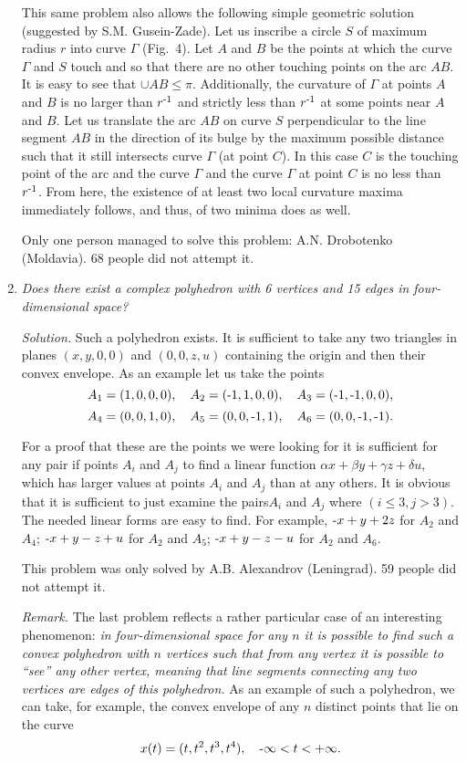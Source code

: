 \documentclass[12pt]{amsart}
\begin{document}
\begin{enumerate}
This same problem also allows the following simple geometric solution (suggested
by S.M. Gusein-Zade).
Let us inscribe a circle $S$ of maximum radius $r$ into curve $\Gamma$ (Fig.~4).
Let $A$ and $B$ be the points at which the curve $\Gamma$ and $S$ touch and so
that there are no other touching points on the arc $AB$.
It is easy to see that $\cup AB\leq\pi$.
Additionally, the curvature of $\Gamma$ at points $A$ and $B$ is no larger than
$r^{\text-1}$ and strictly less than $r^{\text-1}$ at some points near $A$ and
$B$.
Let us translate the arc $AB$ on curve $S$ perpendicular to the line segment
$AB$ in the direction of its bulge by the maximum possible distance such that it
still intersects curve $\Gamma$ (at point $C$).
In this case $C$ is the touching point of the arc and the curve $\Gamma$ and the
curve $\Gamma$ at point $C$ is no less than $r^{\text-1}$.
From here, the existence of at least two local curvature maxima immediately
follows, and thus, of two minima does as well.

Only one person managed to solve this problem: A.N. Drobotenko (Moldavia).
68 people did not attempt it.
\item
\textit{Does there exist a complex polyhedron with 6 vertices and 15 edges in
four-dimensional space?}

\textit{Solution.}
Such a polyhedron exists.
It is sufficient to take any two triangles in planes $(x,y,0,0)$ and
$(0,0,z,u)$ containing the origin and then their convex envelope.
As an example let us take the points
$$A_1=(1,0,0,0),\quad A_2=(\text-1,1,0,0),\quad A_3=(\text-1,\text-1,0,0),$$
$$A_4=(0,0,1,0),\quad A_5=(0,0,\text-1,1),\quad A_6=(0,0,\text-1,\text-1).$$

For a proof that these are the points we were looking for it is sufficient for
any pair if points $A_i$ and $A_j$ to find a linear function
$\alpha x+\beta y+\gamma z+\delta u$, which has larger values at points $A_i$
and $A_j$ than at any others.
It is obvious that it is sufficient to just examine the pairs$A_i$ and $A_j$
where $(i\leq3,j>3)$.
The needed linear forms are easy to find.
For example, $\text-x+y+2z$ for $A_2$ and $A_4$; $\text-x+y-z+u$ for $A_2$ and
$A_5$; $\text-x+y-z-u$ for $A_2$ and $A_6$.

This problem was only solved by A.B. Alexandrov (Leningrad).
59 people did not attempt it.

\textit{Remark.}
The last problem reflects a rather particular case of an interesting phenomenon:
\textit{in four-dimensional space for any $n$ it is possible to find such a
convex polyhedron with $n$ vertices such that from any vertex it is possible to
``see'' any other vertex, meaning that line segments connecting any two vertices
are edges of this polyhedron.}
As an example of such a polyhedron, we can take, for example, the convex
envelope of any $n$ distinct points that lie on the curve
\begin{equation}
x(t)=(t,t^2,t^3,t^4),\quad\text-\infty<t<+\infty.
\end{equation}


\end{enumerate}
\end{document}
